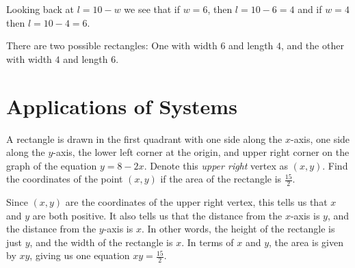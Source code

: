 \documentclass[nooutcomes]{ximera}
\begin{document}
	Looking back at $l = 10-w$ we see that if $w=6$, then $l=10-6 = 4$ and if $w=4$ then $l = 10-4 = 6$.
	
	There are two possible rectangles: One with width $6$ and length $4$, and the other with width $4$ and length $6$.
		
\section{Applications of Systems}

	\begin{exercise}
		A rectangle is drawn in the first quadrant with one side along the $x$-axis, one side along the $y$-axis, the lower left corner at the origin, and upper right corner on the 
		graph of the equation $y=8-2x$. Denote this \emph{upper right} vertex as $(x,y)$. Find the coordinates of the point $(x,y)$ 
		if the area of the rectangle is $\frac{15}{2}$.
		\begin{image}
		\end{image}

		\begin{explanation}
			Since $(x,y)$ are the coordinates of the upper right vertex, this tells us that $x$ and $y$ are both positive.
			It also tells us that the distance from the $x$-axis is $y$, and the distance from the $y$-axis is $x$.
			In other words, the height of the rectangle is just $y$, and the width of the rectangle is $x$. In terms of $x$ and $y$,
			the area is given by $xy$, giving us one equation $xy = \frac{15}{2}$. 
			

\end{explanation}
\end{exercise}
\end{document}
